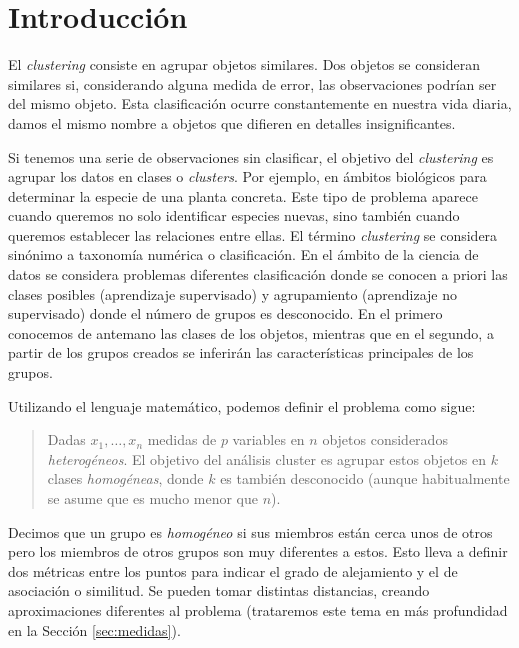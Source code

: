 \documentclass[a4paper, 20pt]{article}
\begin{document}
{\parskip=2pt
  \tableofcontents
}
\pagebreak

\section{Introducción}

El \textit{clustering} consiste en agrupar objetos similares. Dos objetos se consideran similares si, considerando alguna medida de error, las observaciones podrían ser del mismo objeto. Esta clasificación ocurre constantemente en nuestra vida diaria, damos el mismo nombre a objetos que difieren en detalles insignificantes. 


Si tenemos una serie de observaciones sin clasificar, el objetivo del \textit{clustering} es agrupar los datos en clases o \textit{clusters}. Por ejemplo, en ámbitos biológicos para determinar la especie de una planta concreta. Este tipo de problema aparece cuando queremos no solo identificar especies nuevas, sino también cuando queremos establecer las relaciones entre ellas. El término \textit{clustering} se considera sinónimo a taxonomía numérica o clasificación. En el ámbito de la ciencia de datos se considera problemas diferentes clasificación donde se conocen a priori las clases posibles (aprendizaje supervisado) y agrupamiento (aprendizaje no supervisado) donde el número de grupos es desconocido. En el primero conocemos de antemano las clases de los objetos, mientras que en el segundo, a partir de los grupos creados se inferirán las características principales de los grupos.

Utilizando el lenguaje matemático, podemos definir el problema como sigue:

\begin{quote}
  Dadas \textbf{$x_1$}$,\dots, $\textbf{$x_n$} medidas de $p$ variables en $n$ objetos considerados \textit{heterogéneos}. El objetivo del análisis cluster es agrupar estos objetos en $k$ clases \textit{homogéneas}, donde $k$ es también desconocido (aunque habitualmente se asume que es mucho menor que $n$).
\end{quote}

Decimos que un grupo es \textit{homogéneo} si sus miembros están cerca unos de otros pero los miembros de otros grupos son muy diferentes a estos. Esto lleva a definir dos métricas entre los puntos para indicar el grado de alejamiento y el de asociación o similitud. Se pueden tomar distintas distancias, creando aproximaciones diferentes al problema (trataremos este tema en más profundidad en la Sección \ref{sec:medidas}).
\end{document}

